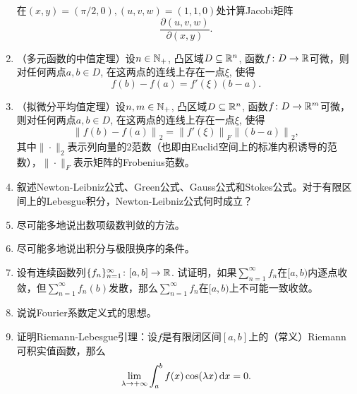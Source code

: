 \begin{enumerate}
\begin{equation*}
    \end{equation*}
    在$(x,y)=(\pi/2,0),(u,v,w)=(1,1,0)$处计算Jacobi矩阵
    \begin{equation*}
        \frac{\partial(u,v,w)}{\partial(x,y)}.
    \end{equation*}
    \item （多元函数的中值定理）设$n\in\mathbb{N_+}$, 凸区域$D\subseteq \mathbb{R}^n$, 函数$f\colon D\to\mathbb{R}$可微，则对任何两点$a,b\in D$, 在这两点的连线上存在一点$\xi$, 使得\begin{equation*}
        f(b)-f(a)=f'(\xi)(b-a).
    \end{equation*}
    \item （拟微分平均值定理）设$n,m\in\mathbb{N_+}$, 凸区域$D\subseteq \mathbb{R}^n$, 函数$f\colon D\to\mathbb{R}^m$可微，则对任何两点$a,b\in D$, 在这两点的连线上存在一点$\xi$, 使得\begin{equation*}
        \left\|f(b)-f(a)\right\|_2=\left\|f'(\xi)\right\|_F\left\|(b-a)\right\|_2,
    \end{equation*}
    其中$\|\cdot\|_2$表示列向量的2范数（也即由Euclid空间上的标准内积诱导的范数），$\|\cdot\|_F$表示矩阵的Frobenius范数。
    \item 叙述Newton-Leibniz公式、Green公式、Gauss公式和Stokes公式。对于有限区间上的Lebesgue积分，Newton-Leibniz公式何时成立？
    \item 尽可能多地说出数项级数判敛的方法。
    \item 尽可能多地说出积分与极限换序的条件。
    \item 设有连续函数列$\{f_n\}_{n=1}^\infty\colon [a,b]\to\mathbb{R}$. 试证明，如果$\sum_{n=1}^{\infty}f_n$在$[a,b)$内逐点收敛，但$\sum_{n=1}^{\infty}f_n(b)$发散，那么$\sum_{n=1}^{\infty}f_n$在$[a,b)$上不可能一致收敛。
    \item 说说Fourier系数定义式的思想。
    \item 证明Riemann-Lebesgue引理：设$f$是有限闭区间$[a,b]$上的（常义）Riemann可积实值函数，那么\begin{equation*}
        \lim_{\lambda\to +\infty}\int_a^b f(x)\cos (\lambda x)\mathop{}\!\mathrm{d} x=0.
    \end{equation*}
\end{enumerate}
